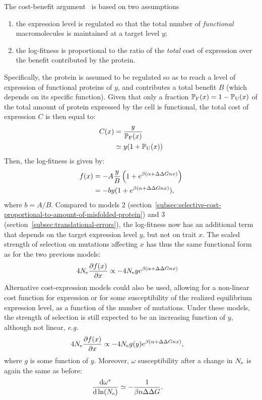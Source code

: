 The cost-benefit argument~\citep{Beaulieu2018} is based on two assumptions
\begin{enumerate}
 \item the expression level is regulated so that the total number of \emph{functional} macromolecules is maintained at a target level $y$;
 \item the log-fitness is proportional to the ratio of the \emph{total} cost of expression over the benefit contributed by the protein.
\end{enumerate}
Specifically, the protein is assumed to be regulated so as to reach a level of expression of functional proteins of $y$, and contributes a total benefit $B$ (which depends on its specific function). Given that only a fraction $\mathbb{P}_{\textrm{F}}(x) = 1-\mathbb{P}_{\textrm{U}}(x)$ of the total amount of protein expressed by the cell is functional, the total cost of expression $C$ is then equal to:
\begin{align}
C(x) & = \frac{y}{\mathbb{P}_{\textrm{F}}(x)}
\\ & \simeq y (1 + \mathbb{P}_{\textrm{U}}(x))
\end{align}
Then, the log-fitness is given by:
\begin{align}
f (x) & = -A \frac{y}{B} \left( 1 + e^{\beta(\alpha + \Delta \Delta Gn x)} \right)
\\
& = -by (1 + e^{\beta(\alpha + \Delta \Delta Gn x)}),
\end{align}
where $b = A /B$.
Compared to models 2 (section~\ref{subsec:selective-cost-proportional-to-amount-of-misfolded-protein}) and 3 (section~\ref{subsec:translational-errors}), the log-fitness now has an additional term that depends on the target expression level $y$, but not on trait $x$. The scaled strength of selection on mutations affecting $x$ has thus the same functional form as for the two previous models:
\begin{align}
4 N_{\mathrm{e}} \frac{\partial  f (x)}{\partial x} & \propto -4 N_{\mathrm{e}} y e^{\beta(\alpha + \Delta \Delta Gn x)}
\end{align}
Alternative cost-expression models could also be used, allowing for a non-linear cost function for expression or for some susceptibility of the realized equilibrium expression level, as a function of the number of mutations. Under these models, the strength of selection is still expected to be an increasing function of $y$, although not linear, \textit{e.g.}
\begin{align}
4 N_{\mathrm{e}} \frac{\partial  f (x)}{\partial x} & \propto -4 N_{\mathrm{e}} g(y) e^{\beta(\alpha + \Delta \Delta Gn x)},
\end{align}
where $g$ is some function of $y$.
Moreover, $\omega$ susceptibility after a change in $N_{\mathrm{e}}$ is again the same as before:
\begin{align}
\frac{ \mathrm{d} \omega^{*}}{\mathrm{d} \ln (N_{\mathrm{e}})} & \simeq - \frac{1}{\beta n \Delta \Delta G}.
\end{align}

